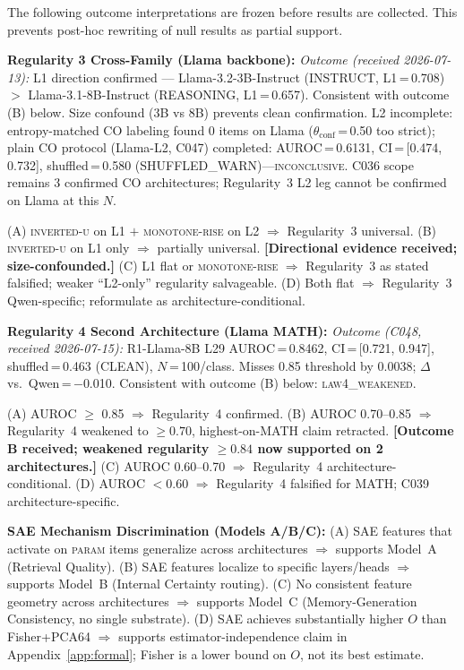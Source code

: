 \documentclass[11pt]{article}
\begin{document}
The following outcome interpretations are frozen before results are collected. This
prevents post-hoc rewriting of null results as partial support.

\textbf{Regularity 3 Cross-Family (Llama backbone):}
\textit{Outcome (received 2026-07-13):} L1 direction confirmed --- Llama-3.2-3B-Instruct
(INSTRUCT, L1\,=\,0.708) $>$ Llama-3.1-8B-Instruct (REASONING, L1\,=\,0.657). Consistent
with outcome (B) below. Size confound (3B vs 8B) prevents clean confirmation.
L2 incomplete: entropy-matched CO labeling found 0 items on Llama ($\theta_\text{conf}$\,=\,0.50
too strict); plain CO protocol (Llama-L2, C047) completed: AUROC\,=\,0.6131,
CI\,=\,[0.474, 0.732], shuffled\,=\,0.580 (SHUFFLED\_WARN)---\textsc{inconclusive}.
C036 scope remains 3 confirmed CO architectures; Regularity~3 L2 leg cannot be confirmed
on Llama at this $N$.

(A) \textsc{inverted-u} on L1 $+$ \textsc{monotone-rise} on L2 $\Rightarrow$ Regularity~3
universal.
(B) \textsc{inverted-u} on L1 only $\Rightarrow$ partially universal. \textbf{[Directional
evidence received; size-confounded.]}
(C) L1 flat or \textsc{monotone-rise} $\Rightarrow$ Regularity~3 as stated falsified; weaker
``L2-only'' regularity salvageable.
(D) Both flat $\Rightarrow$ Regularity~3 Qwen-specific; reformulate as architecture-conditional.

\textbf{Regularity 4 Second Architecture (Llama MATH):}
\textit{Outcome (C048, received 2026-07-15):} R1-Llama-8B L29 AUROC\,=\,0.8462,
CI\,=\,[0.721, 0.947], shuffled\,=\,0.463 (CLEAN), $N$\,=\,100/class.
Misses 0.85 threshold by 0.0038; $\Delta$ vs.\ Qwen\,=\,$-$0.010.
Consistent with outcome (B) below: \textsc{law4\_weakened}.

(A) AUROC $\geq$ 0.85 $\Rightarrow$ Regularity~4 confirmed.
(B) AUROC 0.70--0.85 $\Rightarrow$ Regularity~4 weakened to $\geq 0.70$, highest-on-MATH
claim retracted. \textbf{[Outcome B received; weakened regularity $\geq 0.84$ now supported on 2 architectures.]}
(C) AUROC 0.60--0.70 $\Rightarrow$ Regularity~4 architecture-conditional.
(D) AUROC $< 0.60$ $\Rightarrow$ Regularity~4 falsified for MATH; C039 architecture-specific.

\textbf{SAE Mechanism Discrimination (Models A/B/C):}
(A) SAE features that activate on \textsc{param} items generalize across architectures
$\Rightarrow$ supports Model~A (Retrieval Quality).
(B) SAE features localize to specific layers/heads $\Rightarrow$ supports Model~B
(Internal Certainty routing).
(C) No consistent feature geometry across architectures $\Rightarrow$ supports Model~C
(Memory-Generation Consistency, no single substrate).
(D) SAE achieves substantially higher $O$ than Fisher+PCA64 $\Rightarrow$ supports
estimator-independence claim in Appendix~\ref{app:formal}; Fisher is a lower bound
on $O$, not its best estimate.
\end{document}
